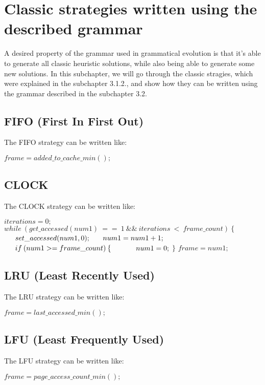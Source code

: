 \section{Classic strategies written using the described grammar}
A desired property of the grammar used in grammatical evolution is that it's able to generate all classic heuristic solutions, while also being able to generate some new solutions. In this subchapter, we will go through the classic stragies, which were explained in the subchapter 3.1.2., and show how they can be written using the grammar described in the subchapter 3.2.

\subsection{FIFO (First In First Out)}

The FIFO strategy can be written like:

\noindent
\begin{algorithmic}
\State $frame = added\_to\_cache\_min();$
\end{algorithmic}

\subsection{CLOCK}

The CLOCK strategy can be written like:

\noindent
\begin{algorithmic}
\State $ iterations = 0;$
\State $ while\:(get\_accessed(num1)\:==\:1\:\&\& \:iterations \:<\:frame\_count)\:\{$
\State $ \indent set\_accessed(num1, 0);$
\State $ \indent num1 = num1 + 1;$
\State $ \indent if\:(num1 >= frame\_count)\:\{$
\State $ \indent\indent num1 = 0;$
\State $ \}$
\State $frame = num1;$
\end{algorithmic}

\subsection{LRU (Least Recently Used)}

The LRU strategy can be written like:

\noindent
\begin{algorithmic}
\State $frame = last\_accessed\_min();$
\end{algorithmic}

\subsection{LFU (Least Frequently Used)}

The LFU strategy can be written like:

\noindent
\begin{algorithmic}
\State $frame = page\_access\_count\_min();$
\end{algorithmic}